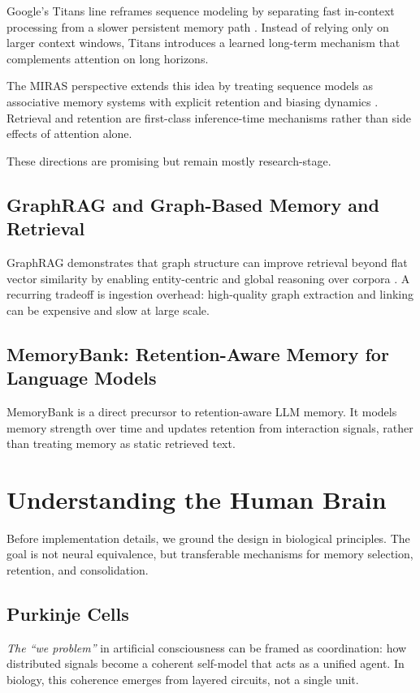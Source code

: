 \documentclass{article}
\begin{document}
Google's Titans line reframes sequence modeling by separating fast
in-context processing from a slower persistent memory path
\cite{behrouz2025titans}. Instead of relying only on larger context windows,
Titans introduces a learned long-term mechanism that complements attention on
long horizons.

The MIRAS perspective extends this idea by treating sequence models as
associative memory systems with explicit retention and biasing dynamics
\cite{behrouz2025allconnected}. Retrieval and retention are first-class
inference-time mechanisms rather than side effects of attention alone.

These directions are promising but remain mostly research-stage.

\subsection{GraphRAG and Graph-Based Memory and Retrieval}

GraphRAG demonstrates that graph structure can improve retrieval beyond flat
vector similarity by enabling entity-centric and global reasoning over
corpora \cite{edge2024graphrag,microsoft2025graphragdocs}. A recurring
tradeoff is ingestion overhead: high-quality graph extraction and linking can
be expensive and slow at large scale.

\subsection{MemoryBank: Retention-Aware Memory for Language Models}

MemoryBank \cite{zhong2023memorybank} is a direct precursor to
retention-aware LLM memory. It models memory strength over time and updates
retention from interaction signals, rather than treating memory as static
retrieved text.

\section{Understanding the Human Brain}

Before implementation details, we ground the design in biological principles.
The goal is not neural equivalence, but transferable mechanisms for memory
selection, retention, and consolidation.

\subsection{Purkinje Cells}
\textit{The ``we problem''} in artificial consciousness can be framed as
coordination: how distributed signals become a coherent self-model that acts
as a unified agent. In biology, this coherence emerges from layered circuits,
not a single unit.
\end{document}
